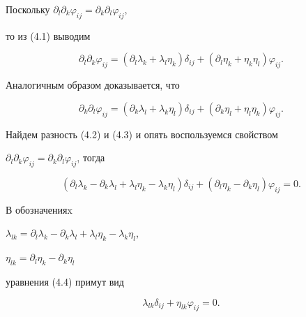 Поскольку $\partial_l\partial_k\varphi_{ij}=\partial_k\partial_l\varphi_{ij}$,


то из (4.1) выводим


\begin{equation}


\partial_l\partial_k\varphi_{ij}=


(\partial_l\lambda_k+\lambda_l\eta_k)\delta_{ij}


+(\partial_l\eta_k+\eta_k\eta_l)\varphi_{ij}.


\end{equation}





Аналогичным образом доказывается, что


\begin{equation}


\partial_k\partial_l\varphi_{ij}=


(\partial_k\lambda_l+\lambda_k\eta_l)\delta_{ij}


+(\partial_k\eta_l+\eta_l\eta_k)\varphi_{ij}.


\end{equation}


Найдем разность (4.2) и (4.3) и опять воспользуемся свойством 


$\partial_l\partial_k\varphi_{ij}=\partial_k\partial_l\varphi_{ij}$, тогда 


\begin{equation}


(\partial_l\lambda_k-\partial_k\lambda_l+\lambda_l\eta_k-


\lambda_k\eta_l)\delta_{ij}


+(\partial_l\eta_k-\partial_k\eta_l)\varphi_{ij}=0.


\end{equation}


В обозначенияx


$\lambda_{lk}=\partial_l\lambda_k-\partial_k\lambda_l+


\lambda_l\eta_k-\lambda_k\eta_l$,


$\eta_{lk}=\partial_l\eta_k-\partial_k\eta_l$


уравнения (4.4) примут вид


\begin{equation}


\lambda_{lk}\delta_{ij}+\eta_{lk}\varphi_{ij}=0.


\end{equation}


